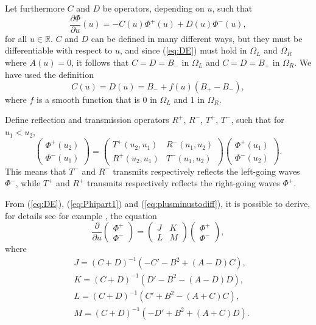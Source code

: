 \documentclass[numreferences]{kluwer}
\renewcommand{\Phi}{\varPhi}
\renewcommand{\vec}[1]{\bm{#1}}
\newcommand{\R}{\mathbb R}
\newcommand{\pd}[2]{\dfrac{\partial#1}{\partial#2}}
\renewcommand{\Phi}{\varPhi}
\begin{document}
Let furthermore $C$ and $D$ be operators, depending on $u$, such that
\begin{equation}
  \label{eq:plusminustodiff}
    \dfrac{\partial\vec\Phi}{\partial u}(u)=
    -C(u)\vec\Phi^+(u)+D(u)\vec\Phi^-(u),
\end{equation}
for all $u\in\R$. $C$ and $D$ can be defined in many different ways,
but they must be differentiable with respect to $u$, and since
(\ref{eq:DE}) must hold in $\Omega_L$ and $\Omega_R$ where $A(u)=0$,
it follows that $C=D=B_-$ in $\Omega_L$ and $C=D=B_+$ in
$\Omega_R$. We have used the definition
\begin{equation}
  \label{eq:CD}
  C(u)=D(u)=B_-+f(u)(B_+-B_-),
\end{equation}
where $f$ is a smooth function that is $0$ in $\Omega_L$ and $1$ in
$\Omega_R$. 

Define reflection and transmission
operators $R^+$, $R^-$, $T^+$, $T^-$, such that for $u_1<u_2$,
\begin{equation}
  \label{eq:RT}
  \begin{pmatrix}
    \vec\Phi^+(u_2)\\
    \vec\Phi^-(u_1)
  \end{pmatrix}=
  \begin{pmatrix}
    T^+(u_2,u_1)&R^-(u_1,u_2)\\
    R^+(u_2,u_1)&T^-(u_1,u_2)
  \end{pmatrix}
  \begin{pmatrix}
    \vec\Phi^+(u_1)\\
    \vec\Phi^-(u_2)
  \end{pmatrix}.
\end{equation}
This means that $T^-$ and $R^-$ transmits respectively reflects the
left-going waves $\vec\Phi^-$, while $T^+$ and $R^+$ transmits
respectively reflects the right-going waves $\vec\Phi^+$.


From (\ref{eq:DE}), (\ref{eq:Phipart1}) and
(\ref{eq:plusminustodiff}), it is possible to derive, for details see
for example \cite{Nilsson:2002}, the equation
\begin{equation}
  \label{eq:diffphiplusminus}
  \pd{}u
  \begin{pmatrix}
    \vec\Phi^+\\\vec\Phi^-
  \end{pmatrix}
  =
  \begin{pmatrix}
    J&K\\
    L&M
  \end{pmatrix}
  \begin{pmatrix}
    \vec\Phi^+\\\vec\Phi^-
  \end{pmatrix},
\end{equation}
where
\begin{equation}
  \label{eq:alphabeta}
  \begin{split}
    &J=(C+D)^{-1}\left(-C'-B^2+(A-D)C\right),\\
    &K=(C+D)^{-1}\left(D'-B^2-(A-D)D\right),\\
    &L=(C+D)^{-1}\left(C'+B^2-(A+C)C\right),\\
    &M=(C+D)^{-1}\left(-D'+B^2+(A+C)D\right).
  \end{split}
\end{equation}
\end{document}
